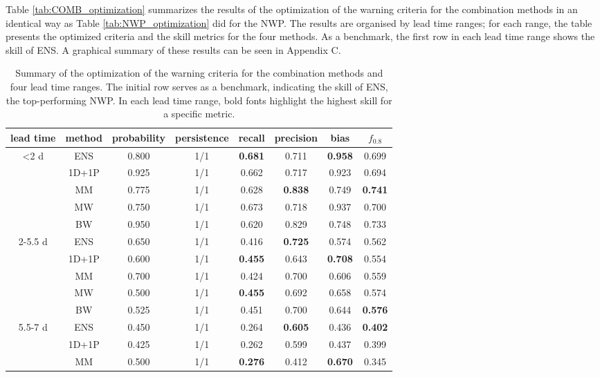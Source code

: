 \documentclass{ametsocV6.1}
\begin{document}
Table \ref{tab:COMB_optimization} summarizes the results of the optimization of the warning criteria for the combination methods in an identical way as Table \ref{tab:NWP_optimization} did for the NWP. The results are organised by lead time ranges; for each range, the table presents the optimized criteria and the skill metrics for the four methods. As a benchmark, the first row in each lead time range shows the skill of ENS. A graphical summary of these results can be seen in Appendix C.
\begin{table}[ht]
    \centering
    \caption{Summary of the optimization of the warning criteria for the combination methods and four lead time ranges. The initial row serves as a benchmark, indicating the skill of ENS, the top-performing NWP. In each lead time range, bold fonts highlight the highest skill for a specific metric. }
    \begin{tabular}{cccccccc}
        \toprule
        lead time & method & probability & persistence & recall & precision & bias & $f_{0.8}$ \\
        \midrule
        \textless 2 d& ENS & 0.800 & 1/1 & \textbf{0.681} & 0.711 & \textbf{0.958} & 0.699 \\
         & 1D+1P & 0.925 & 1/1 & 0.662 & 0.717 & 0.923 & 0.694 \\
         & MM & 0.775 & 1/1 & 0.628 & \textbf{0.838} & 0.749 & \textbf{0.741} \\
         & MW & 0.750 & 1/1 & 0.673 & 0.718 & 0.937 & 0.700 \\
         & BW & 0.950 & 1/1 & 0.620 & 0.829 & 0.748 & 0.733 \\
         \midrule
        2-5.5 d & ENS & 0.650 & 1/1 & 0.416 & \textbf{0.725} & 0.574 & 0.562 \\
         & 1D+1P & 0.600 & 1/1 & \textbf{0.455} & 0.643 & \textbf{0.708} & 0.554 \\
         & MM & 0.700 & 1/1 & 0.424 & 0.700 & 0.606 & 0.559 \\
         & MW & 0.500 & 1/1 & \textbf{0.455} & 0.692 & 0.658 & 0.574 \\
         & BW & 0.525 & 1/1 & 0.451 & 0.700 & 0.644 & \textbf{0.576} \\
         \midrule
        5.5-7 d & ENS & 0.450 & 1/1 & 0.264 & \textbf{0.605} & 0.436 & \textbf{0.402} \\
         & 1D+1P & 0.425 & 1/1 & 0.262 & 0.599 & 0.437 & 0.399 \\
         & MM & 0.500 & 1/1 & \textbf{0.276} & 0.412 & \textbf{0.670} & 0.345 \\

\end{tabular}
\end{table}
\end{document}
